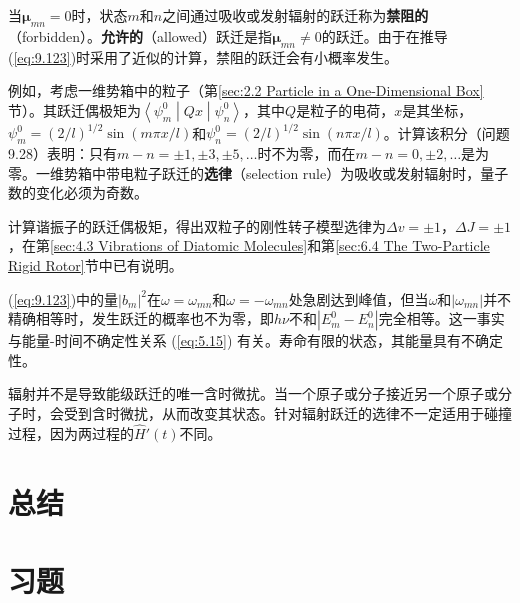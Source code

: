     当$\mathbf{\mu}_{mn} = 0$时，状态$m$和$n$之间通过吸收或发射辐射的跃迁称为\textbf{禁阻的}（forbidden）。\textbf{允许的}（allowed）跃迁是指$\mathbf{\mu}_{mn} \neq 0$的跃迁。由于在推导(\ref{eq:9.123})时采用了近似的计算，禁阻的跃迁会有小概率发生。

    例如，考虑一维势箱中的粒子（第\ref{sec:2.2 Particle in a One-Dimensional Box}节）。其跃迁偶极矩为$\left\langle \psi_m^0 \middle| Qx \middle| \psi_n^0 \right\rangle$，其中$Q$是粒子的电荷，$x$是其坐标，$\psi_m^0 = \left(2/l\right)^{1/2}\sin\left(m\pi x/l\right)$和$\psi_n^0 = \left(2/l\right)^{1/2}\sin\left(n\pi x/l\right)$。计算该积分（问题9.28）表明：只有$m - n = \pm 1, \pm 3, \pm 5, \ldots$时不为零，而在$m - n = 0, \pm 2,\ldots$是为零。一维势箱中带电粒子跃迁的\textbf{选律}（selection rule）为吸收或发射辐射时，量子数的变化必须为奇数。

    计算谐振子的跃迁偶极矩，得出双粒子的刚性转子模型选律为$\Delta v = \pm 1$，$\Delta J = \pm 1$，在第\ref{sec:4.3 Vibrations of Diatomic Molecules}和第\ref{sec:6.4 The Two-Particle Rigid Rotor}节中已有说明。

    (\ref{eq:9.123})中的量$\left|b_m\right|^2$在$\omega = \omega_{mn}$和$\omega = -\omega_{mn}$处急剧达到峰值，但当$\omega$和$\left| \omega_{mn} \right|$并不精确相等时，发生跃迁的概率也不为零，即$h\nu$不和$\left|E_m^0 - E_n^0\right|$完全相等。这一事实与能量-时间不确定性关系 (\ref{eq:5.15}) 有关。寿命有限的状态，其能量具有不确定性。

    辐射并不是导致能级跃迁的唯一含时微扰。当一个原子或分子接近另一个原子或分子时，会受到含时微扰，从而改变其状态。针对辐射跃迁的选律不一定适用于碰撞过程，因为两过程的$\hat{H}'\left(t\right)$不同。



\section*{总结}

\section*{习题}